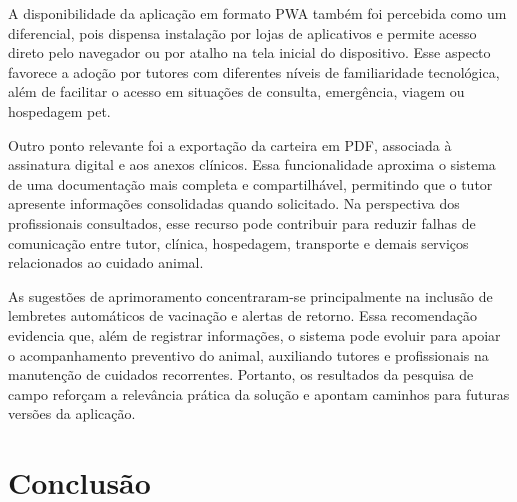 \documentclass{UNESC}
\begin{document}
A disponibilidade da aplicação em formato PWA também foi percebida como um diferencial, pois dispensa instalação por lojas de aplicativos e permite acesso direto pelo navegador ou por atalho na tela inicial do dispositivo. Esse aspecto favorece a adoção por tutores com diferentes níveis de familiaridade tecnológica, além de facilitar o acesso em situações de consulta, emergência, viagem ou hospedagem pet.

Outro ponto relevante foi a exportação da carteira em PDF, associada à assinatura digital e aos anexos clínicos. Essa funcionalidade aproxima o sistema de uma documentação mais completa e compartilhável, permitindo que o tutor apresente informações consolidadas quando solicitado. Na perspectiva dos profissionais consultados, esse recurso pode contribuir para reduzir falhas de comunicação entre tutor, clínica, hospedagem, transporte e demais serviços relacionados ao cuidado animal.

As sugestões de aprimoramento concentraram-se principalmente na inclusão de lembretes automáticos de vacinação e alertas de retorno. Essa recomendação evidencia que, além de registrar informações, o sistema pode evoluir para apoiar o acompanhamento preventivo do animal, auxiliando tutores e profissionais na manutenção de cuidados recorrentes. Portanto, os resultados da pesquisa de campo reforçam a relevância prática da solução e apontam caminhos para futuras versões da aplicação.

\endgroup

\section{Conclusão}


\renewcommand{\refname}{REFERÊNCIAS}

%
%
\end{document}
